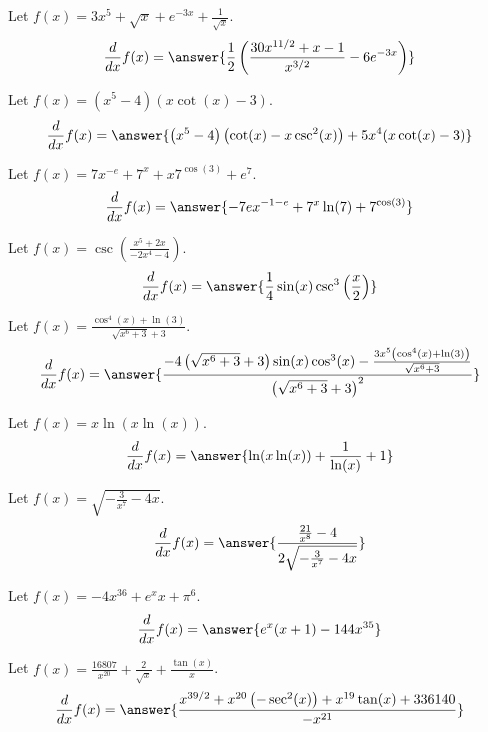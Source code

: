 \documentclass{ximera}
\begin{document}
\begin{shuffle}
\begin{exercise}
Let $f(x)=3 x^5+\sqrt{x}+e^{-3 x}+\frac{1}{\sqrt{x}}$.
\[
\ddx f(x) = \answer{\frac{1}{2} \left(\frac{30 x^{11/2}+x-1}{x^{3/2}}-6 e^{-3 x}\right)}
\]
\end{exercise}

\begin{exercise}
Let $f(x)=\left(x^5-4\right) (x \cot (x)-3)$.
\[
\ddx f(x) = \answer{\left(x^5-4\right) \left(\cot (x)-x \csc ^2(x)\right)+5 x^4 (x \cot (x)-3)}
\]
\end{exercise}

\begin{exercise}
Let $f(x)=7 x^{-e}+7^x+x 7^{\cos (3)}+e^7$.
\[
\ddx f(x) = \answer{-7 e x^{-1-e}+7^x \ln (7)+7^{\cos (3)}}
\]
\end{exercise}

\begin{exercise}
Let $f(x)=\csc \left(\frac{x^5+2 x}{-2 x^4-4}\right)$.
\[
\ddx f(x) = \answer{\frac{1}{4} \sin (x) \csc ^3\left(\frac{x}{2}\right)}
\]
\end{exercise}

\begin{exercise}
Let $f(x)=\frac{\cos ^4(x)+\ln (3)}{\sqrt{x^6+3}+3}$.
\[
\ddx f(x) = \answer{\frac{-4 \left(\sqrt{x^6+3}+3\right) \sin (x) \cos ^3(x)-\frac{3 x^5 \left(\cos ^4(x)+\ln (3)\right)}{\sqrt{x^6+3}}}{\left(\sqrt{x^6+3}+3\right)^2}}
\]
\end{exercise}

\begin{exercise}
Let $f(x)=x \ln (x \ln (x))$.
\[
\ddx f(x) = \answer{\ln (x \ln (x))+\frac{1}{\ln (x)}+1}
\]
\end{exercise}

\begin{exercise}
Let $f(x)=\sqrt{-\frac{3}{x^7}-4 x}$.
\[
\ddx f(x) = \answer{\frac{\frac{21}{x^8}-4}{2 \sqrt{-\frac{3}{x^7}-4 x}}}
\]
\end{exercise}

\begin{exercise}
Let $f(x)=-4 x^{36}+e^x x+\pi ^6$.
\[
\ddx f(x) = \answer{e^x (x+1)-144 x^{35}}
\]
\end{exercise}

\begin{exercise}
Let $f(x)=\frac{16807}{x^{20}}+\frac{2}{\sqrt{x}}+\frac{\tan (x)}{x}$.
\[
\ddx f(x) = \answer{\frac{x^{39/2}+x^{20} \left(-\sec ^2(x)\right)+x^{19} \tan (x)+336140}{-x^{21}}}
\]
\end{exercise}


\end{shuffle}
\end{document}
